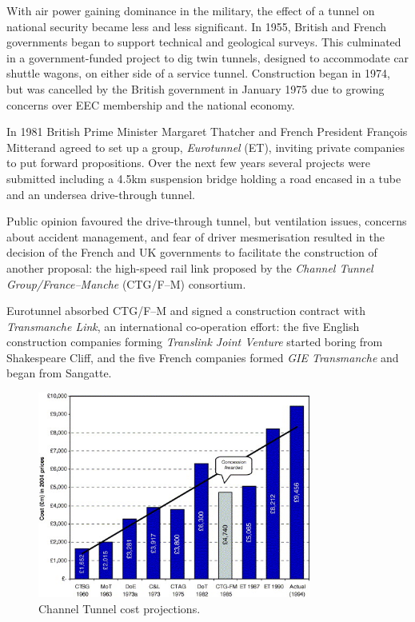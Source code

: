 \documentclass[12pt]{article} %
\begin{document}
With air power gaining dominance in the military, the effect of a tunnel on national security became less and less significant. In 1955, British and French governments began to support technical and geological surveys. This culminated in a government-funded project to dig twin tunnels, designed to accommodate car shuttle wagons, on either side of a service tunnel. Construction began in 1974, but was cancelled by the British government in January 1975 due to growing concerns over EEC membership and the national economy.

In 1981 British Prime Minister Margaret Thatcher and French President François Mitterand agreed to set up a group, \emph{Eurotunnel} (ET), inviting private companies to put forward propositions. Over the next few years several projects were submitted including a 4.5km suspension bridge holding a road encased in a tube and an undersea drive-through tunnel.

Public opinion favoured the drive-through tunnel, but ventilation issues, concerns about accident management, and fear of driver mesmerisation resulted in the decision of the French and UK governments to facilitate the construction of another proposal: the high-speed rail link proposed by the \emph{Channel Tunnel Group\slash France--Manche} (CTG\slash F--M) consortium.

Eurotunnel absorbed CTG\slash F--M and signed a construction contract with \emph{Transmanche Link}, an international co-operation effort: the five English construction companies forming \emph{Translink Joint Venture} started boring from Shakespeare Cliff, and the five French companies formed \emph{GIE Transmanche} and began from Sangatte.

\begin{figure}[hp]
  \centering
  \includegraphics[width=0.8\textwidth]{costproj}
  \caption{Channel Tunnel cost projections.}
  \label{fig:costproj}
\end{figure}
\end{document}
